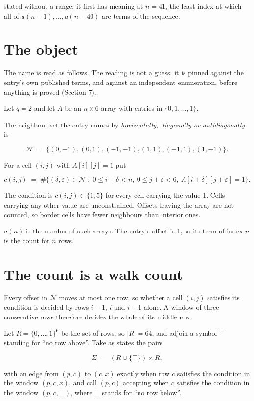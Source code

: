 \documentclass[11pt]{article}
\theoremstyle{definition}
\begin{document}
stated without a range; it first has meaning at $n = 41$, the least index at which all of $a(n-1),\dots,a(n-40)$ are terms of the sequence.

\section{The object}

The name is read as follows. The reading is not a guess: it is pinned against the entry's own published terms, and against an independent enumeration, before anything is proved (Section 7).

Let $q = 2$ and let $A$ be an $n \times 6$ array with entries in $\{0,1,\dots,1\}$.

The neighbour set the entry names by {\itshape horizontally, diagonally or antidiagonally} is

\[\mathcal{N} \;=\; \{(0,-1), (0,1), (-1,-1), (1,1), (-1,1), (1,-1)\}.\]

For a cell $(i,j)$ with $A[i][j] = 1$ put

\[c(i,j) \;=\; \#\bigl\{(\delta,\varepsilon)\in\mathcal{N} \;:\; 0\le i+\delta<n,\ 0\le j+\varepsilon<6,\ A[i+\delta][j+\varepsilon] = 1\bigr\}.\]

The condition is $c(i,j) \in \{1, 5\}$ for every cell carrying the value 1. Cells carrying any other value are unconstrained. Offsets leaving the array are not counted, so border cells have fewer neighbours than interior ones.

$a(n)$ is the number of such arrays. The entry's offset is 1, so its term of index $n$ is the count for $n$ rows.

\section{The count is a walk count}

Every offset in $\mathcal{N}$ moves at most one row, so whether a cell $(i,j)$ satisfies its condition is decided by rows $i-1$, $i$ and $i+1$ alone. A window of three consecutive rows therefore decides the whole of its middle row.

Let $R = \{0,\dots,1\}^{6}$ be the set of rows, so $|R| = 64$, and adjoin a symbol $\top$ standing for ``no row above''. Take as states the pairs

\[\Sigma \;=\; (R \cup \{\top\}) \times R,\]

with an edge from $(p,c)$ to $(c,x)$ exactly when row $c$ satisfies the condition in the window $(p,c,x)$, and call $(p,c)$ accepting when $c$ satisfies the condition in the window $(p,c,\bot)$, where $\bot$ stands for ``no row below''.
\end{document}
